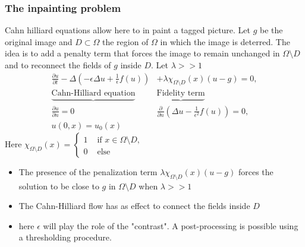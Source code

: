 \documentclass[11pt]{article}
\newcommand{\Frac}[2] {\frac{\textstyle #1} {\textstyle #2}}
\begin{document}
\subsubsection{The inpainting problem}
Cahn hilliard equations allow here to in paint a tagged picture.
Let $g$ be the original image and $D\subset \Omega$  the region of $\Omega$ in which the image is deterred. The idea is to add a penalty term that forces the image to remain unchanged in $\Omega\setminus D$ and to reconnect the fields of $g$ inside $D$. Let $\lambda >>1$
\begin{eqnarray}
\Frac{\partial u}{\partial t} -\Delta( -\epsilon \Delta u +\Frac{1}{\epsilon}f(u))&+\lambda\chi_{\Omega\setminus D}(x)(u-g)=0,\\
\underbrace{\mbox{Cahn-Hilliard equation} }&\underbrace{\mbox{Fidelity term} }\\
\Frac{\partial u}{\partial n}=0&\Frac{\partial }{\partial n}\left(\Delta u-\Frac{1}{\epsilon^2}f(u)\right)=0,\\
u(0,x)=u_0(x)&
\end{eqnarray}
Here $\chi_{\Omega\setminus D}(x)=\left\{\begin{array}{ll}1 &\mbox{ if } x\in \Omega\setminus D,\\ 0 &\mbox{ else}\end{array}$
\begin{itemize}
\item The presence of the penalization  term $\lambda\chi_{\Omega\setminus D}(x)(u-g)$ forces the solution to be close to $g$ in $\Omega\setminus D$ when $\lambda>>1$
\item The Cahn-Hilliard flow has as effect to connect the fields inside $D$
\item here $\epsilon$ will play the role of the "contrast". A post-processing is possible using a thresholding procedure.
\end{itemize}
\end{document}
